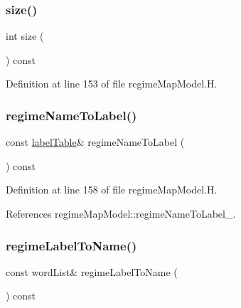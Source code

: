 \subsubsection{\texorpdfstring{size()}{size()}}
{\footnotesize\ttfamily int size (\begin{DoxyParamCaption}{ }\end{DoxyParamCaption}) const\hspace{0.3cm}{\ttfamily [inline]}}



Definition at line 153 of file regime\+Map\+Model.\+H.

\mbox{\label{classFoam_1_1regimeMapModel_ae5c6e8c83ecc0e1a95fcec6c4923e527}} 
\subsubsection{\texorpdfstring{regime\+Name\+To\+Label()}{regimeNameToLabel()}}
{\footnotesize\ttfamily const \hyperlink{classFoam_1_1regimeMapModel_a5b5512e1ee06ad6419a57dd400b53807}{label\+Table}\& regime\+Name\+To\+Label (\begin{DoxyParamCaption}{ }\end{DoxyParamCaption}) const\hspace{0.3cm}{\ttfamily [inline]}}



Definition at line 158 of file regime\+Map\+Model.\+H.



References regime\+Map\+Model\+::regime\+Name\+To\+Label\+\_\+.

\mbox{\label{classFoam_1_1regimeMapModel_a4b943f8f62001d3ff09053acf54dbe86}} 
\subsubsection{\texorpdfstring{regime\+Label\+To\+Name()}{regimeLabelToName()}}
{\footnotesize\ttfamily const word\+List\& regime\+Label\+To\+Name (\begin{DoxyParamCaption}{ }\end{DoxyParamCaption}) const\hspace{0.3cm}{\ttfamily [inline]}}



